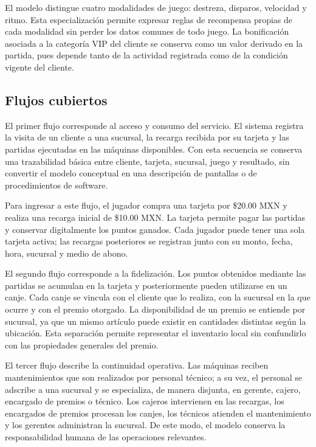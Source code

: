 El modelo distingue cuatro modalidades de juego: destreza, disparos, velocidad
y ritmo. Esta especialización permite expresar reglas de recompensa propias de
cada modalidad sin perder los datos comunes de todo juego. La bonificación
asociada a la categoría VIP del cliente se conserva como un valor derivado en
la partida, pues depende tanto de la actividad registrada como de la condición
vigente del cliente.

\subsection{Flujos cubiertos}

El primer flujo corresponde al acceso y consumo del servicio. El sistema
registra la visita de un cliente a una sucursal, la recarga recibida por su
tarjeta y las partidas ejecutadas en las máquinas disponibles. Con esta
secuencia se conserva una trazabilidad básica entre cliente, tarjeta, sucursal,
juego y resultado, sin convertir el modelo conceptual en una descripción de
pantallas o de procedimientos de software.

Para ingresar a este flujo, el jugador compra una tarjeta por \$20.00 MXN y
realiza una recarga inicial de \$10.00 MXN. La tarjeta permite pagar las
partidas y conservar digitalmente los puntos ganados. Cada jugador puede tener
una sola tarjeta activa; las recargas posteriores se registran junto con su
monto, fecha, hora, sucursal y medio de abono.

El segundo flujo corresponde a la fidelización. Los puntos obtenidos mediante
las partidas se acumulan en la tarjeta y posteriormente pueden utilizarse en
un canje. Cada canje se vincula con el cliente que lo realiza, con la sucursal
en la que ocurre y con el premio otorgado. La disponibilidad de un premio se
entiende por sucursal, ya que un mismo artículo puede existir en cantidades
distintas según la ubicación. Esta separación permite representar el inventario
local sin confundirlo con las propiedades generales del premio.

El tercer flujo describe la continuidad operativa. Las máquinas reciben
mantenimientos que son realizados por personal técnico; a su vez, el personal
se adscribe a una sucursal y se especializa, de manera disjunta, en gerente,
cajero, encargado de premios o técnico. Los cajeros intervienen en las
recargas, los encargados de premios procesan los canjes, los técnicos atienden
el mantenimiento y los gerentes administran la sucursal. De este modo, el
modelo conserva la responsabilidad humana de las operaciones relevantes.

